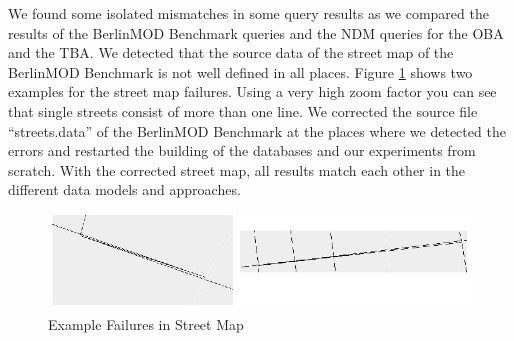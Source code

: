 \documentclass[a4paper]{article}
\newcommand{\bmodb} {BerlinMOD Benchmark}
\begin{document}
We found some isolated mismatches in some query results as we compared the results
of the \bmodb{} queries and the NDM queries for the OBA and the TBA. We detected
that the source data of the street map of the \bmodb{} is not well defined in all places.
Figure \ref{fig:routefailure} shows two examples for the street map failures. Using
a very high zoom factor you can see that single streets consist of more than one
line. We corrected the source file ``streets.data'' of the \bmodb{} at the places
where we detected the errors and restarted the building of the databases and our
experiments from scratch. With the corrected street map, all results match
each other in the different data models and approaches.
\begin{figure}[H]
\begin{center}
   \includegraphics[scale=1.0]{routefailure.eps}
   \caption{Example Failures in Street Map}
   \label{fig:routefailure}
   \end{center}
\end{figure}
\end{document}
